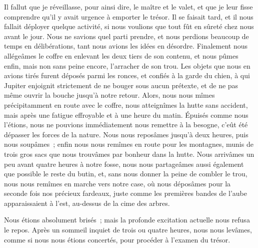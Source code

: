 \documentclass[french,twoside]{book} %
\begin{document}
Il fallut que je réveillasse, pour ainsi dire, le maître et le valet, et que je leur fisse comprendre qu’il y avait urgence à emporter le trésor. Il se faisait tard, et il nous fallait déployer quelque activité, si nous voulions que tout fût en sûreté chez nous avant le jour. Nous ne savions quel parti prendre, et nous perdions beaucoup de temps en délibérations, tant nous avions les idées en désordre. Finalement nous allégeâmes le coffre en enlevant les deux tiers de son contenu, et nous pûmes enfin, mais non sans peine encore, l’arracher de son trou. Les objets que nous en avions tirés furent déposés parmi les ronces, et confiés à la garde du chien, à qui Jupiter enjoignit strictement de ne bouger sous aucun prétexte, et de ne pas même ouvrir la bouche jusqu’à notre retour. Alors, nous nous mîmes précipitamment en route avec le coffre, nous atteignîmes la hutte sans accident, mais après une fatigue effroyable et à une heure du matin. Épuisés comme nous l’étions, nous ne pouvions immédiatement nous remettre à la besogne, c’eût été dépasser les forces de la nature. Nous nous reposâmes jusqu’à deux heures, puis nous soupâmes ; enfin nous nous remîmes en route pour les montagnes, munis de trois gros sacs que nous trouvâmes par bonheur dans la hutte. Nous arrivâmes un peu avant quatre heures à notre fosse, nous nous partageâmes aussi également que possible le reste du butin, et, sans nous donner la peine de combler le trou, nous nous remîmes en marche vers notre case, où nous déposâmes pour la seconde fois nos précieux fardeaux, juste comme les premières bandes de l’aube apparaissaient à l’est, au-dessus de la cime des arbres.\par
Nous étions absolument brisés ; mais la profonde excitation actuelle nous refusa le repos. Après un sommeil inquiet de trois ou quatre heures, nous nous levâmes, comme si nous nous étions concertés, pour procéder à l’examen du trésor.\par
\end{document}
